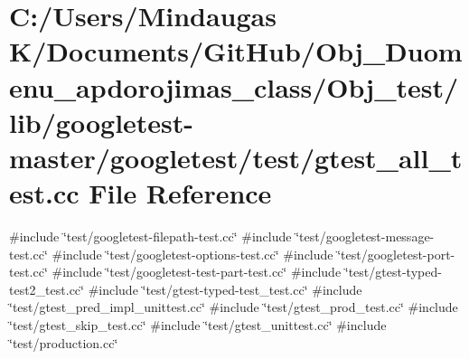 \hypertarget{_obj__test_2lib_2googletest-master_2googletest_2test_2gtest__all__test_8cc}{}\section{C\+:/\+Users/\+Mindaugas K/\+Documents/\+Git\+Hub/\+Obj\+\_\+\+Duomenu\+\_\+apdorojimas\+\_\+class/\+Obj\+\_\+test/lib/googletest-\/master/googletest/test/gtest\+\_\+all\+\_\+test.cc File Reference}
\label{_obj__test_2lib_2googletest-master_2googletest_2test_2gtest__all__test_8cc}
{\ttfamily \#include \char`\"{}test/googletest-\/filepath-\/test.\+cc\char`\"{}}\newline
{\ttfamily \#include \char`\"{}test/googletest-\/message-\/test.\+cc\char`\"{}}\newline
{\ttfamily \#include \char`\"{}test/googletest-\/options-\/test.\+cc\char`\"{}}\newline
{\ttfamily \#include \char`\"{}test/googletest-\/port-\/test.\+cc\char`\"{}}\newline
{\ttfamily \#include \char`\"{}test/googletest-\/test-\/part-\/test.\+cc\char`\"{}}\newline
{\ttfamily \#include \char`\"{}test/gtest-\/typed-\/test2\+\_\+test.\+cc\char`\"{}}\newline
{\ttfamily \#include \char`\"{}test/gtest-\/typed-\/test\+\_\+test.\+cc\char`\"{}}\newline
{\ttfamily \#include \char`\"{}test/gtest\+\_\+pred\+\_\+impl\+\_\+unittest.\+cc\char`\"{}}\newline
{\ttfamily \#include \char`\"{}test/gtest\+\_\+prod\+\_\+test.\+cc\char`\"{}}\newline
{\ttfamily \#include \char`\"{}test/gtest\+\_\+skip\+\_\+test.\+cc\char`\"{}}\newline
{\ttfamily \#include \char`\"{}test/gtest\+\_\+unittest.\+cc\char`\"{}}\newline
{\ttfamily \#include \char`\"{}test/production.\+cc\char`\"{}}\newline
